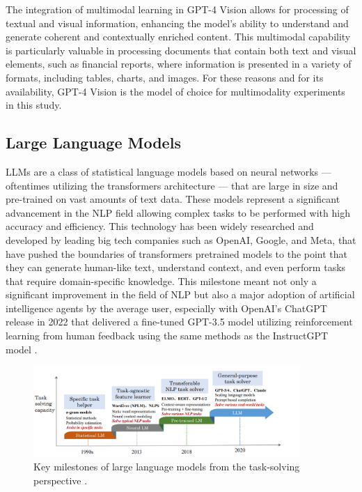 \documentclass[english, 12pt, a4paper, elec, utf8, a-2b, online]{aaltothesis}
\begin{document}
The integration of multimodal learning in GPT-4 Vision allows for processing of textual and visual information, enhancing the model's ability to understand and generate coherent and contextually enriched content.
This multimodal capability is particularly valuable in processing documents that contain both text and visual elements, such as financial reports, where information is presented in a variety of formats, including tables, charts, and images.
For these reasons and for its availability, GPT-4 Vision is the model of choice for multimodality experiments in this study.

\subsection{Large Language Models}

\ac{LLM}s are a class of statistical language models based on neural networks --- oftentimes utilizing the transformers architecture --- that are large in size and pre-trained on vast amounts of text data.
These models represent a significant advancement in the \ac{NLP} field allowing complex tasks to be performed with high accuracy and efficiency.
This technology has been widely researched and developed by leading big tech companies such as OpenAI, Google, and Meta, \cite{Brown2020, Devlin2019, Radford2021, OpenAI2023GPT4, Gemini2022, Gemini2024} that have pushed the boundaries of transformers pretrained models to the point that they can generate human-like text, understand context, and even perform tasks that require domain-specific knowledge.
This milestone meant not only a significant improvement in the field of \ac{NLP} but also a major adoption of artificial intelligence agents by the average user, especially with OpenAI's ChatGPT release in 2022 that delivered a fine-tuned GPT-3.5 model utilizing reinforcement learning from human feedback using the same methods as the InstructGPT model \cite{Ouyang2022}.

\begin{figure}[H]
    \centering
    \includegraphics[width=0.9\textwidth]{images/llms_milestones.png}
    \caption{Key milestones of large language models from the task-solving perspective \cite{Zhao2023}.}
    \label{fig:llms_milestones}
\end{figure}
\end{document}
